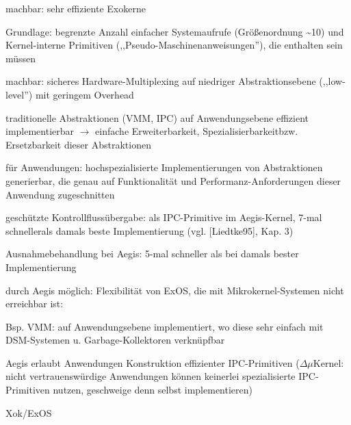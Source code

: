 \documentclass[a4paper]{article}
\begin{document}
\begin{multicols}{3}
    \begin{enumerate*}
        \item
        machbar: sehr effiziente Exokerne
        \begin{itemize*}
            \item Grundlage: begrenzte Anzahl einfacher Systemaufrufe (Größenordnung \textasciitilde10) und Kernel-interne Primitiven (,,Pseudo-Maschinenanweisungen''), die enthalten sein müssen
        \end{itemize*}
        \item
        machbar: sicheres Hardware-Multiplexing auf niedriger
        Abstraktionsebene (,,low-level'') mit geringem Overhead
        \item
        traditionelle Abstraktionen (VMM, IPC) auf Anwendungsebene effizient
        implementierbar $\rightarrow$ einfache
        Erweiterbarkeit, Spezialisierbarkeitbzw. Ersetzbarkeit dieser
        Abstraktionen
        \item
        für Anwendungen: hochspezialisierte Implementierungen von
        Abstraktionen generierbar, die genau auf Funktionalität und
        Performanz-Anforderungen dieser Anwendung zugeschnitten
        \item
        geschützte Kontrollflussübergabe: als IPC-Primitive im Aegis-Kernel,
        7-mal schnellerals damals beste Implementierung (vgl. [Liedtke95],
        Kap. 3)
        \item
        Ausnahmebehandlung bei Aegis: 5-mal schneller als bei damals bester
        Implementierung
        \item
        durch Aegis möglich: Flexibilität von ExOS, die mit
        Mikrokernel-Systemen nicht erreichbar ist:
        \begin{itemize*}
            \item Bsp. VMM: auf Anwendungsebene implementiert, wo diese sehr einfach mit DSM-Systemen u. Garbage-Kollektoren verknüpfbar
        \end{itemize*}
        \item
        Aegis erlaubt Anwendungen Konstruktion effizienter IPC-Primitiven ($\Delta \mu$Kernel: nicht vertrauenswürdige Anwendungen können keinerlei spezialisierte IPC-Primitiven nutzen, geschweige denn selbst implementieren)
    \end{enumerate*}

    Xok/ExOS


\end{multicols}
\end{document}
